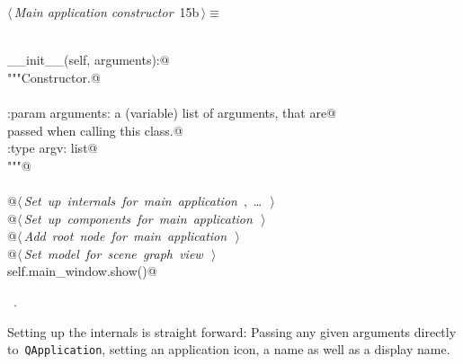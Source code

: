 \documentclass[
    a4paper,      %
    10pt,         %
    openright,    %
    notitlepage,  %
    parskip=half, %
]{scrreprt}       %
\theoremstyle{definition}                    %
\begin{document}
\begin{flushleft} \small
\begin{minipage}{\linewidth}\label{scrap3}\raggedright\small
{} $\langle\,${\itshape Main application constructor}\nobreak\ {\footnotesize {15b}}$\,\rangle\equiv$
\vspace{-1exm}
\begin{list}{}{} \item
\mbox{}\lstinline@@\\
\mbox{}\lstinline@def __init__(self, arguments):@\\
\mbox{}\lstinline@    """Constructor.@\\
\mbox{}\lstinline@@\\
\mbox{}\lstinline@    :param arguments: a (variable) list of arguments, that are@\\
\mbox{}\lstinline@                      passed when calling this class.@\\
\mbox{}\lstinline@    :type  argv:      list@\\
\mbox{}\lstinline@    """@\\
\mbox{}\lstinline@@\\
\mbox{}\lstinline@    @\hbox{$\langle\,${\itshape Set up internals for main application}\nobreak\ {\footnotesize {}, \ldots\ }$\,\rangle$}\lstinline@@\\
\mbox{}\lstinline@    @\hbox{$\langle\,${\itshape Set up components for main application}\nobreak\ {\footnotesize {}}$\,\rangle$}\lstinline@@\\
\mbox{}\lstinline@    @\hbox{$\langle\,${\itshape Add root node for main application}\nobreak\ {\footnotesize {}}$\,\rangle$}\lstinline@@\\
\mbox{}\lstinline@    @\hbox{$\langle\,${\itshape Set model for scene graph view}\nobreak\ {\footnotesize {}}$\,\rangle$}\lstinline@@\\
\mbox{}\lstinline@    self.main_window.show()@\\
\mbox{}\lstinline@@{\NWsep}
\end{list}
\vspace{-1.5ex}
\footnotesize
\begin{list}{}{\setlength{\itemsep}{-\parsep}\setlength{\itemindent}{-\leftmargin}}
\item \NWtxtMacroRefIn\ .

\item{}
\end{list}
\end{minipage}\vspace{4ex}
\end{flushleft}
Setting up the internals is straight forward: Passing any given arguments
directly to~\verb+QApplication+, setting an application icon, a name as well as
a display name.
\end{document}

